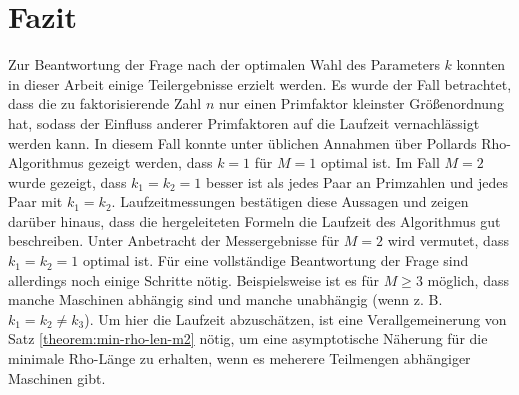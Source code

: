 \documentclass[a4paper, 10pt, ngerman]{article}
\begin{document}
    \section{Fazit}

    Zur Beantwortung der Frage nach der optimalen Wahl des Parameters $k$ konnten in dieser Arbeit einige Teilergebnisse erzielt werden. Es wurde der Fall betrachtet, dass die zu faktorisierende Zahl $n$ nur einen Primfaktor kleinster Größenordnung hat, sodass der Einfluss anderer Primfaktoren auf die Laufzeit vernachlässigt werden kann. In diesem Fall konnte unter üblichen Annahmen über Pollards Rho-Algorithmus gezeigt werden, dass $k = 1$ für $M = 1$ optimal ist. Im Fall $M = 2$ wurde gezeigt, dass $k_1 = k_2 = 1$ besser ist als jedes Paar an Primzahlen und jedes Paar mit $k_1 = k_2$. Laufzeitmessungen bestätigen diese Aussagen und zeigen darüber hinaus, dass die hergeleiteten Formeln die Laufzeit des Algorithmus gut beschreiben. Unter Anbetracht der Messergebnisse für $M = 2$ wird vermutet, dass $k_1 = k_2 = 1$ optimal ist. Für eine vollständige Beantwortung der Frage sind allerdings noch einige Schritte nötig. Beispielsweise ist es für $M \ge 3$ möglich, dass manche Maschinen abhängig sind und manche unabhängig (wenn z. B. $k_1 = k_2 \ne k_3$). Um hier die Laufzeit abzuschätzen, ist eine Verallgemeinerung von Satz \ref{theorem:min-rho-len-m2} nötig, um eine asymptotische Näherung für die minimale Rho-Länge zu erhalten, wenn es meherere Teilmengen abhängiger Maschinen gibt.

\newpage
\printbibliography
\end{document}
